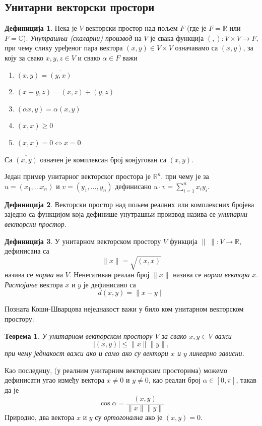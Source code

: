 \documentclass{report}
\theoremstyle{plain}
\newtheorem{thm}{Теорема}
\theoremstyle{definition}
\newtheorem{defn}{Дефиниција}
\begin{document}
\subsection{Унитарни векторски простори}
\begin{defn}
Нека је $V$ векторски простор над пољем $F$ (где је $F=\mathbb{R}$ или $F=\mathbb{C}$). \emph{Унутрашњи (скаларни) производ} на $V$ је свака функција $(,):V\times V\to F$, при чему слику уређеног пара вектора $(x, y)\in V\times V$ означавамо са $(x, y)$, за коју за свако $x, y, z\in V$ и свако $\alpha \in F$ важи
\begin{enumerate}
  \item $(x, y) = \overline{(y, x)}$
  \item $(x+y, z) = (x, z)+(y, z)$
  \item $(\alpha x, y) = \alpha (x, y)$
  \item $(x, x)\geq 0$
  \item $(x, x) = 0 \Leftrightarrow x=0$
\end{enumerate}
Са $\overline{(x, y)}$ означен је комплексан број конјугован са $(x, y)$.
\end{defn}
Један пример унитарног векторског простора је $\mathbb{R}^n$, при чему је за $u = (x_1, ...x_n)$ и $v = (y_1, ..., y_n)$ дефинисано $u\cdot v = \sum_{i=1}^n x_iy_i$.

\begin{defn}
Векторски простор над пољем реалних или комплексних бројева заједно са функцијом која дефинише унутрашњи производ назива се \emph{унитарни векторски простор}.
\end{defn}
\begin{defn}
У унитарном векторском простору $V$ функција $\|\;\|:V\to \mathbb{R}$, дефинисана са $$\|x\| = \sqrt{(x, x)}$$ назива се \emph{норма} на $V$. Ненегативан реалан број $\|x\|$ назива се \emph{норма вектора} $x$.
\emph{Растојање} вектора $x$ и $y$ је дефинисано са $$d(x, y) = \|x-y\|$$
\end{defn}
Позната Коши-Шварцова неједнакост важи у било ком унитарном векторском простору:
\begin{thm}
У унитарном векторском простору $V$ за свако $x, y\in V$ важи
$$|(x, y)|\leq\|x\|\|y\|,$$
при чему једнакост важи ако и само ако су вектори $x$ и $y$ линеарно зависни.
\end{thm}
Као последицу, (у реалним унитарним векторским просторима) можемо дефинисати угао између вектора $x\neq 0$ и $y\neq 0$, као реалан број $\alpha\in [0, \pi]$, такав да је $$\cos \alpha = \frac{(x, y)}{\|x\|\|y\|}$$
Природно, два вектора $x$ и $y$ су \emph{ортогонална} ако је $(x, y) = 0$.
\end{document}

